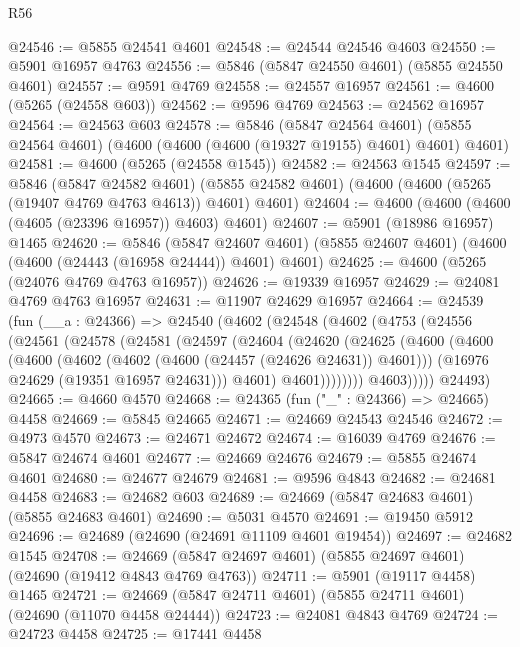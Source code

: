 \begin{lexlean}{R56}
\begin{coremodule}
@24546 := @5855 @24541 @4601
@24548 := @24544 @24546 @4603
@24550 := @5901 @16957 @4763
@24556 := @5846 (@5847 @24550 @4601) (@5855 @24550 @4601)
@24557 := @9591 @4769
@24558 := @24557 @16957
@24561 := @4600 (@5265 (@24558 @603))
@24562 := @9596 @4769
@24563 := @24562 @16957
@24564 := @24563 @603
@24578 := @5846
    (@5847 @24564 @4601)
    (@5855 @24564 @4601)
    (@4600 (@4600 (@4600 (@19327 @19155) @4601) @4601) @4601)
@24581 := @4600 (@5265 (@24558 @1545))
@24582 := @24563 @1545
@24597 := @5846
    (@5847 @24582 @4601)
    (@5855 @24582 @4601)
    (@4600 (@4600 (@5265 (@19407 @4769 @4763 @4613)) @4601) @4601)
@24604 := @4600 (@4600 (@4600 (@4605 (@23396 @16957)) @4603) @4601)
@24607 := @5901 (@18986 @16957) @1465
@24620 := @5846
    (@5847 @24607 @4601)
    (@5855 @24607 @4601)
    (@4600 (@4600 (@24443 (@16958 @24444)) @4601) @4601)
@24625 := @4600 (@5265 (@24076 @4769 @4763 @16957))
@24626 := @19339 @16957
@24629 := @24081 @4769 @4763 @16957
@24631 := @11907 @24629 @16957
@24664 := @24539
    (fun (__a : @24366) =>
    @24540
      (@4602
        (@24548
          (@4602
            (@4753
              (@24556
                (@24561
                  (@24578
                    (@24581
                      (@24597
                        (@24604
                          (@24620
                            (@24625
                              (@4600
                                (@4600
                                  (@4600
                                    (@4602 (@4602 (@4600 (@24457 (@24626 @24631)) @4601)))
                                    (@16976 @24629 (@19351 @16957 @24631)))
                                  @4601)
                                @4601))))))))
                @4603)))))
      @24493)
@24665 := @4660 @4570
@24668 := @24365 (fun ("_" : @24366) => @24665) @4458
@24669 := @5845 @24665
@24671 := @24669 @24543 @24546
@24672 := @4973 @4570
@24673 := @24671 @24672
@24674 := @16039 @4769
@24676 := @5847 @24674 @4601
@24677 := @24669 @24676
@24679 := @5855 @24674 @4601
@24680 := @24677 @24679
@24681 := @9596 @4843
@24682 := @24681 @4458
@24683 := @24682 @603
@24689 := @24669 (@5847 @24683 @4601) (@5855 @24683 @4601)
@24690 := @5031 @4570
@24691 := @19450 @5912
@24696 := @24689 (@24690 (@24691 @11109 @4601 @19454))
@24697 := @24682 @1545
@24708 := @24669 (@5847 @24697 @4601) (@5855 @24697 @4601) (@24690 (@19412 @4843 @4769 @4763))
@24711 := @5901 (@19117 @4458) @1465
@24721 := @24669 (@5847 @24711 @4601) (@5855 @24711 @4601) (@24690 (@11070 @4458 @24444))
@24723 := @24081 @4843 @4769
@24724 := @24723 @4458
@24725 := @17441 @4458

\end{coremodule}
\end{lexlean}
